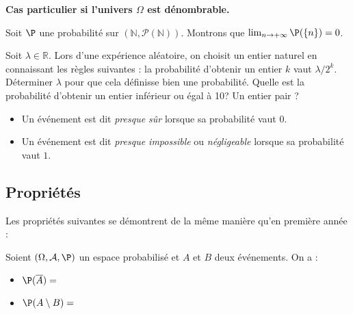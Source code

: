 \documentclass[a4paper,10pt]{report}
\begin{document}
\begin{itemize}
\medskip

\textbf{Cas particulier si l'univers $\Omega$ est dénombrable.}

\medskip

\vspace{9cm}

\begin{Exemple} Soit $\P$ une probabilité sur $(\mathbb{N}, \mathcal{P}(\mathbb{N}))$. Montrons que $\lim_{n \rightarrow + \infty} \P( \lbrace n \rbrace )= 0$.
 \newpage
\end{Exemple}
\begin{ApplicationDirecte}
Soit $\lambda \in \mathbb{R}$. Lors d'une expérience aléatoire, on choisit un entier naturel en connaissant les règles suivantes : la probabilité d'obtenir un entier $k$ vaut $ \lambda/2^k$. Déterminer $\lambda$ pour que cela définisse bien une probabilité. Quelle est la probabilité d'obtenir un entier inférieur ou égal à 10? Un entier pair ?
\end{ApplicationDirecte}

\begin{Definition}{}
\begin{itemize}
\item Un événement est dit \emph{presque sûr} lorsque sa probabilité vaut $0$.
\item Un événement est dit \emph{presque impossible} ou \emph{négligeable} lorsque sa probabilité vaut $1$.
\end{itemize}
\end{Definition}


 




\subsection{Propriétés}
Les propriétés suivantes se démontrent de la même manière qu'en première année : 

\begin{Proposition}{}\label{Prop1}
Soient $(\Omega, \mathcal{A}, \P)$ un espace probabilisé et $A$ et $B$ deux événements. On a :
\begin{itemize}
\item $\P(\overline{A})=$\phantom{$1-P(A)$.}
\item $\P(A \setminus B) =$\phantom{$\P(A)-P(A \cap B)$.}
\end{itemize}
\end{Proposition}


\end{itemize}
\end{document}
